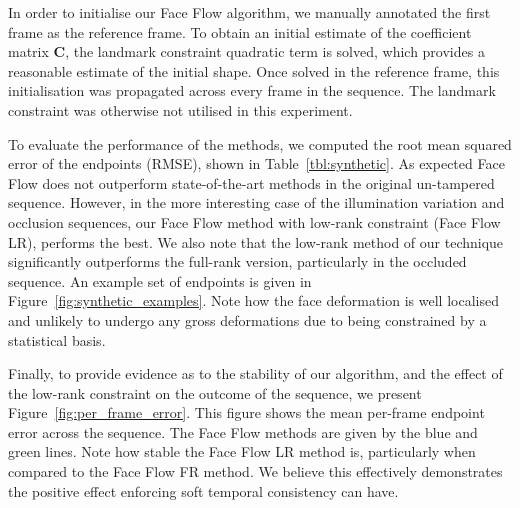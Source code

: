 In order to initialise our Face Flow algorithm, we manually annotated the first frame
as the reference frame. To obtain an initial estimate of the coefficient
matrix $\mathbf{C}$, the landmark constraint quadratic term is solved, which
provides a reasonable estimate of the initial shape. Once solved in the reference frame,
this initialisation was propagated across every frame in the sequence. The landmark constraint
was otherwise not utilised in this experiment.

To evaluate the performance of the methods, we computed the root mean squared
error of the endpoints (RMSE), shown in Table~\ref{tbl:synthetic}. As expected
Face Flow does not outperform state-of-the-art methods in the original un-tampered
sequence. However, in the more interesting case of the illumination variation
and occlusion sequences, our Face Flow method with low-rank constraint (Face Flow LR),
performs the best. We also note that the low-rank method of our technique significantly
outperforms the full-rank version, particularly in the occluded sequence. An example
set of endpoints is given in Figure~\ref{fig:synthetic_examples}. Note how
the face deformation is well localised and unlikely to undergo any gross deformations
due to being constrained by a statistical basis.

Finally, to provide evidence as to the stability of our algorithm, and the effect
of the low-rank constraint on the outcome of the sequence, we present Figure~\ref{fig:per_frame_error}.
This figure shows the mean per-frame endpoint error across the sequence. The Face Flow
methods are given by the blue and green lines. Note how stable the Face Flow LR method is,
particularly when compared to the Face Flow FR method. We believe this effectively
demonstrates the positive effect enforcing soft temporal consistency can have.
